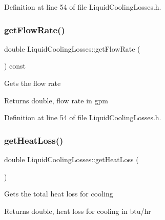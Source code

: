 Definition at line 54 of file Liquid\+Cooling\+Losses.\+h.

\mbox{\label{class_liquid_cooling_losses_acb4a68199bdc5f0597d1feadc3ecdb2c}} 
\subsubsection{\texorpdfstring{get\+Flow\+Rate()}{getFlowRate()}\hspace{0.1cm}{\footnotesize\ttfamily [3/3]}}
{\footnotesize\ttfamily double Liquid\+Cooling\+Losses\+::get\+Flow\+Rate (\begin{DoxyParamCaption}{ }\end{DoxyParamCaption}) const\hspace{0.3cm}{\ttfamily [inline]}}

Gets the flow rate \begin{DoxyReturn}{Returns}
double, flow rate in gpm 
\end{DoxyReturn}


Definition at line 54 of file Liquid\+Cooling\+Losses.\+h.

\mbox{\label{class_liquid_cooling_losses_a6a131f8f3141edef7f29df4455c6aee5}} 
\subsubsection{\texorpdfstring{get\+Heat\+Loss()}{getHeatLoss()}\hspace{0.1cm}{\footnotesize\ttfamily [1/3]}}
{\footnotesize\ttfamily double Liquid\+Cooling\+Losses\+::get\+Heat\+Loss (\begin{DoxyParamCaption}{ }\end{DoxyParamCaption})}

Gets the total heat loss for cooling \begin{DoxyReturn}{Returns}
double, heat loss for cooling in btu/hr 
\end{DoxyReturn}
\mbox{\label{class_liquid_cooling_losses_a6a131f8f3141edef7f29df4455c6aee5}} 
